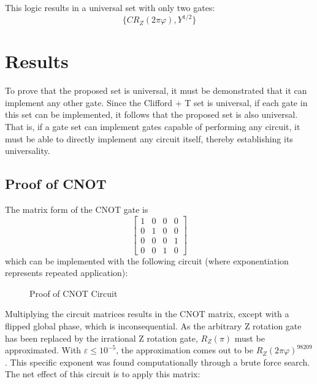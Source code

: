 \documentclass[12pt]{article}
\begin{document}
This logic results in a universal set with only two gates:
$$\{CR_Z(2\pi\varphi), Y^{1/2}\}$$

\section{Results}
To prove that the proposed set is universal, it must be demonstrated that it can implement any other gate. Since the Clifford + T set is universal, if each gate in this set can be implemented, it follows that the proposed set is also universal. That is, if a gate set can implement gates capable of performing any circuit, it must be able to directly implement any circuit itself, thereby establishing its universality.

\subsection{Proof of CNOT}
The matrix form of the CNOT gate is
$$
\begin{bmatrix}
    1&0&0&0\\
    0&1&0&0\\
    0&0&0&1\\
    0&0&1&0
\end{bmatrix}
$$
which can be implemented with the following circuit (where exponentiation represents repeated application):
\begin{figure}[ht]
    \centering
    \caption{Proof of CNOT Circuit}
    \label{fig:proof-CNOT-1}
\end{figure}

Multiplying the circuit matrices results in the CNOT matrix, except with a flipped global phase, which is inconsequential. As the arbitrary Z rotation gate has been replaced by the irrational Z rotation gate, $R_Z(\pi)$ must be approximated. With $\varepsilon \le 10^{-5}$, the approximation comes out to be $R_Z(2\pi\varphi)^{98209}$. This specific exponent was found computationally through a brute force search. The net effect of this circuit is to apply this matrix:
\end{document}
